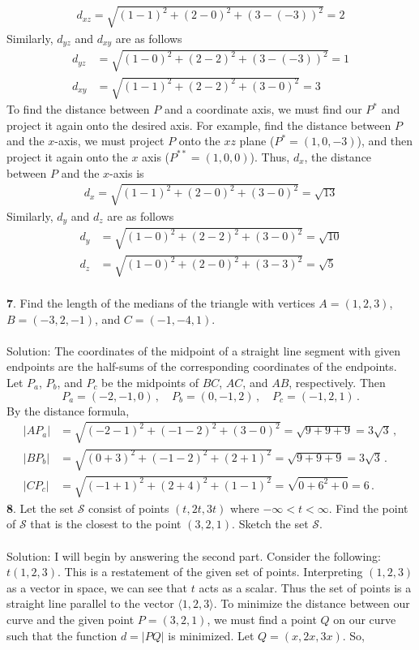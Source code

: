 \documentclass[12pt]{amsbook}
\let\cal\mathcal
\newcommand{\la}{\langle}
\newcommand{\ra}{\rangle}
\begin{document}
\begin{align*}
d_{xz}=\sqrt{(1-1)^2+(2-0)^2+(3-(-3))^2}=2
\end{align*}
Similarly, $d_{yz}$ and $d_{xy}$ are as follows
\begin{align*}
d_{yz}&=\sqrt{(1-0)^2+(2-2)^2+(3-(-3))^2}=1\\
d_{xy}&=\sqrt{(1-1)^2+(2-2)^2+(3-0)^2}=3
\end{align*}
To find the distance between $P$ and a coordinate axis, we must find our $P^*$ and project it again onto the desired axis. For example, find the distance between $P$ and the $x$-axis, we must project $P$ onto the $xz$ plane ($P^*=(1,0,-3)$), and then project it again onto the $x$ axis ($P^{**}=(1,0,0)$). Thus, $d_x$, the distance between $P$ and the $x$-axis is
\begin{align*}
d_x=\sqrt{(1-1)^2+(2-0)^2+(3-0)^2}=\sqrt{13}
\end{align*}
Similarly, $d_y$ and $d_z$ are as follows
\begin{align*}
d_y&=\sqrt{(1-0)^2+(2-2)^2+(3-0)^2}=\sqrt{10}\\
d_z&=\sqrt{(1-0)^2+(2-0)^2+(3-3)^2}=\sqrt{5}
\end{align*}
\\
{\small\bf 7}. Find the length of the medians of the triangle 
with vertices $A=(1,2,3)$, $B=(-3,2,-1)$, and $C=(-1,-4,1)$.\\
\\
{\sc Solution}: The coordinates of the midpoint 
of a straight line segment with given endpoints
are the half-sums of the corresponding coordinates
of the endpoints. Let $P_a$,
$P_b$, and $P_c$ be the midpoints of $BC$, $AC$,
and $AB$, respectively. Then
$$
P_a=(-2,-1,0)\,,\quad P_b=(0,-1,2)\,,\quad
P_c=(-1,2,1)\,.
$$
By the distance formula,
\begin{align*}
|AP_a|&=\sqrt{(-2-1)^2+(-1-2)^2+(3-0)^2}=\sqrt{9+9+9}=3\sqrt{3}\,,\\
|BP_b|&=\sqrt{(0+3)^2+(-1-2)^2+(2+1)^2}=\sqrt{9+9+9}=3\sqrt{3}\,.\\
|CP_c|&=\sqrt{(-1+1)^2+(2+4)^2+(1-1)^2}=\sqrt{0+6^2+0}=6\,.
\end{align*}
{\small\bf 8}. Let the set ${\cal S}$ consist of points $(t,2t,3t)$
where $-\infty<t<\infty$. Find the point of ${\cal S}$ that is the
closest to the point $(3,2,1)$. Sketch the set ${\cal S}$.\\
\\
{\sc Solution}:
I will begin by answering the second part. Consider the following: $t(1,2,3)$. This is a restatement of the given set of points. Interpreting $(1,2,3)$ as a vector in space, we can see that $t$ acts as a scalar. Thus the set of points is a straight line parallel to the vector $\la 1,2,3 \ra$. To minimize the distance between our curve and the given point $P=(3,2,1)$, we must find a point $Q$ on our curve such that the function $d=|PQ|$ is minimized. Let $Q=(x,2x,3x)$. So,
\end{document}
